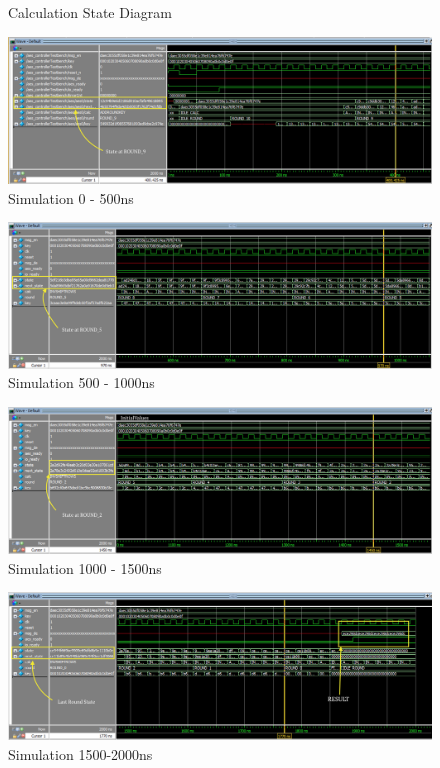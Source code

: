 \documentclass[journal, twocolumn, final,11pt,letterpaper]{IEEEtran}
\begin{document}
\begin{figure} [H]
	\centering
	\caption{Calculation State Diagram\label{fig:calc-state}}
\end{figure}    



\begin{figure} [H]
	\centering
	\includegraphics[scale=.35]{simulate-0-500.png}
	\caption{Simulation 0 - 500ns\label{fig:0-500}}
\end{figure}          


\begin{figure} [H]
	\centering
	\includegraphics[scale=.35]{simulate-500-1000.png}
	\caption{Simulation 500 - 1000ns\label{fig:500-1000}}
\end{figure}          


\begin{figure} [H]
	\centering
	\includegraphics[scale=.35]{simulate-1000-1500.png}
	\caption{Simulation 1000 - 1500ns\label{fig:1000-1500}}
\end{figure}          


\begin{figure} [H]
	\centering
	\includegraphics[scale=.35]{simulate-1500-2000.png}
	\caption{Simulation 1500-2000ns\label{fig:1500-2000}}
\end{figure}          
\end{document}
